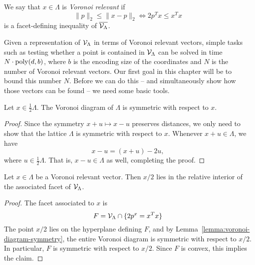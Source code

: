 \begin{definition}
  We say that $x \in \Lambda$ is \emph{Voronoi relevant} if
  \[
    \| p \|_2 \leq \| x - p \|_2 \iff 2p^Tx \leq x^T x
  \]
  is a facet-defining inequality of $\overline{\mathcal{V}_\Lambda}$.
\end{definition}

Given a representation of $\mathcal{V}_\Lambda$ in terms of Voronoi relevant vectors,
simple tasks such as testing whether a point is contained in $\mathcal{V}_\Lambda$
can be solved in time $N \cdot \operatorname{poly}(d, b)$,
where $b$ is the encoding size of the coordinates
and $N$ is the number of Voronoi relevant vectors.
Our first goal in this chapter will be to bound this number $N$.
Before we can do this -- and simultaneously show how those vectors
can be found -- we need some basic tools.

\begin{lemma}
  \label{lemma:voronoi-diagram-symmetry}
  Let $x \in \frac{1}{2} \Lambda$.
  The Voronoi diagram of $\Lambda$ is symmetric with respect to $x$.
\end{lemma}
\begin{proof}
  Since the symmetry $x + u \mapsto x - u$ preserves distances,
  we only need to show that the lattice $\Lambda$ is symmetric with respect to $x$.
  Whenever $x + u \in \Lambda$, we have
  \[
    x - u = (x + u) - 2u,
  \]
  where $u \in \frac{1}{2} \Lambda$.
  That is, $x - u \in \Lambda$ as well, completing the proof.
\end{proof}

\begin{lemma}
  \label{lemma:voronoi-relevant-facet-interior}
  Let $x \in \Lambda$ be a Voronoi relevant vector.
  Then $x/2$ lies in the relative interior of the associated facet of $\mathcal{V}_\Lambda$.
\end{lemma}
\begin{proof}
  The facet associated to $x$ is
  \[
    F = \mathcal{V}_\Lambda \cap \{ 2p^x = x^Tx \}
  \]
  The point $x/2$ lies on the hyperplane defining $F$,
  and by Lemma~\ref{lemma:voronoi-diagram-symmetry},
  the entire Voronoi diagram is symmetric with respect to $x/2$.
  In particular, $F$ is symmetric with respect to $x/2$.
  Since $F$ is convex, this implies the claim.
\end{proof}


